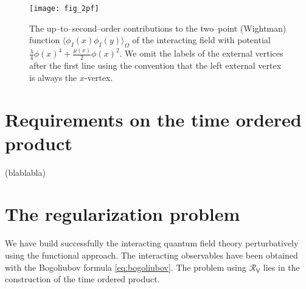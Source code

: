 \documentclass[12pt]{book}
\newcommand{\Rcal}{\mathcal{R}}
\newcommand{\Vsf}{\mathsf{V}}
\theoremstyle{break}
\begin{document}
\begin{figure}[!htb]\begin{center}
\texttt{[image: fig\_2pf]}
\end{center}
\caption{The up--to--second--order contributions to the two--point (Wightman) function $\langle\phi_I(x)\phi_I(y)\rangle_\Omega$ of the interacting field with potential $\frac{\lambda}{4}\phi(x)^4+\frac{\mu(x)}{2}\phi(x)^2$. We omit the labels of the external vertices after the first line using the convention that the left external vertex is always the $x$-vertex.}
\label{fig:2pf}
\end{figure}


\section{Requirements on the time ordered product}


(blablabla) \cite{hollands_local_2001,hollands_existence_2002}


\section{The regularization problem}\label{p:EPSTEIN_GLASER}


We have build successfully the interacting quantum field theory perturbatively using the functional approach. The interacting observables have been obtained with the Bogoliubov formula \eqref{eq:bogoliubov}. The problem using $\Rcal_\Vsf$ lies in the construction of the time ordered product.


\end{document}
